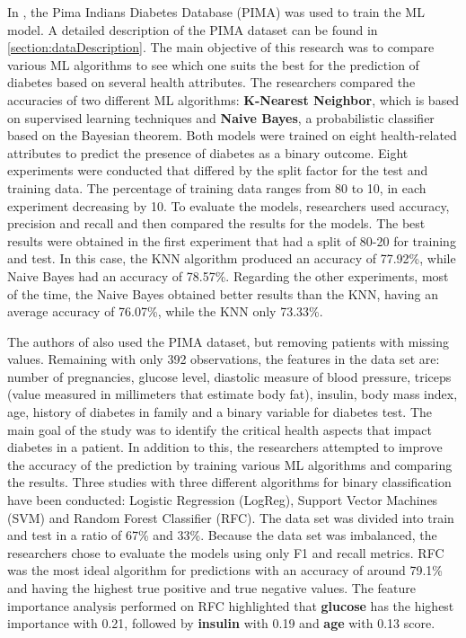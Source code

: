 \documentclass[runningheads]{llncs}
\begin{document}
In \cite{FEBRIAN202321}, the Pima Indians Diabetes Database (PIMA)  was used to train the ML model. A detailed description of the PIMA dataset can be found in \autoref{section:dataDescription}.
The main objective of this research was to compare various ML algorithms to see which one suits the best for the prediction of diabetes based on several health attributes. The researchers compared the accuracies of two different ML algorithms: \textbf{K-Nearest Neighbor}, which is based on supervised learning techniques and \textbf{Naive Bayes}, a probabilistic classifier based on the Bayesian theorem. 
Both models were trained on eight health-related attributes to predict the presence of diabetes as a binary outcome. Eight experiments were conducted that differed by the split factor for the test and training data. The percentage of training data ranges from 80 to 10, in each experiment decreasing by 10. 
To evaluate the models, researchers used accuracy, precision and recall and then compared the results for the models. The best results were obtained in the first experiment that had a split of 80-20 for training and test. In this case, the KNN algorithm produced an accuracy of 77.92\%, while Naive Bayes had an accuracy of 78.57\%. Regarding the other experiments, most of the time, the Naive Bayes obtained better results than the KNN, having an average accuracy of 76.07\%, while the KNN only 73.33\%.


The authors of \cite{Dutta} also used the PIMA dataset, but removing patients with missing values. Remaining with only 392 observations, the features in the data set are: number of pregnancies, glucose level, diastolic measure of blood pressure, triceps (value measured in millimeters that estimate body fat), insulin, body mass index, age, history of diabetes in family and a binary variable for diabetes test.
The main goal of the study was to identify the critical health aspects that impact diabetes in a patient. In addition to this, the researchers attempted to improve the accuracy of the prediction by training various ML algorithms and comparing the results.
Three studies with three different algorithms for binary classification have been conducted: Logistic Regression (LogReg), Support Vector Machines (SVM) and Random Forest Classifier (RFC). The data set was divided into train and test in a ratio of 67\% and 33\%. 
Because the data set was imbalanced, the researchers chose to evaluate the models using only F1 and recall metrics. RFC was the most ideal algorithm for predictions with an accuracy of around 79.1\% and having the highest true positive and true negative values. The feature importance analysis performed on RFC highlighted that \textbf{glucose} has the highest importance with 0.21, followed by \textbf{insulin} with 0.19 and \textbf{age} with 0.13 score.
\end{document}
